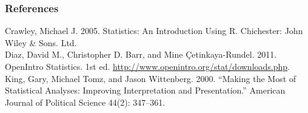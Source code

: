 \documentclass{beamer}\usepackage{graphicx, color}
\begin{document}
\begin{frame}[allowframebreaks]
  \frametitle{References}
  Crawley, Michael J. 2005. Statistics: An Introduction Using R. Chichester: John Wiley & Sons. Ltd. \\[0.25cm]
  Diaz, David M., Christopher D. Barr, and Mine \c{C}etinkaya-Rundel. 2011. OpenIntro 
  Statistics. 1st ed. \url{http://www.openintro.org/stat/downloads.php}. \\[0.25cm] 
  King, Gary, Michael Tomz, and Jason Wittenberg. 2000. “Making the Most of Statistical Analyses: Improving Interpretation and Presentation.” American Journal of Political Science 44(2): 347–361.
\end{frame}
\end{document}
